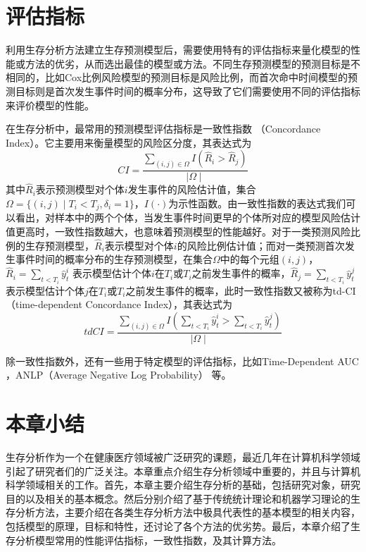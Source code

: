 \section{评估指标}

利用生存分析方法建立生存预测模型后，需要使用特有的评估指标来量化模型的性能或方法的优劣，从而选出最佳的模型或方法。不同生存预测模型的预测目标是不相同的，比如Cox比例风险模型的预测目标是风险比例，而首次命中时间模型的预测目标则是首次发生事件时间的概率分布，这导致了它们需要使用不同的评估指标来评价模型的性能。

在生存分析中，最常用的预测模型评估指标是一致性指数 （Concordance Index）。它主要用来衡量模型的风险区分度，其表达式为
\begin{equation}
CI=\frac{\sum_{(i,j)\in \Omega} I(\hat{R}_i > \hat{R}_j)}{\mid \Omega \mid} \label{F13}
\end{equation}
其中$\hat{R}_i$表示预测模型对个体$i$发生事件的风险估计值，集合$\Omega=\{(i,j)\mid T_i<T_j,\delta_i=1\}$，$I(\cdot)$为示性函数。由一致性指数的表达式我们可以看出，对样本中的两个个体，当发生事件时间更早的个体所对应的模型风险估计值更高时，一致性指数越大，也意味着预测模型的性能越好。对于一类预测风险比例的生存预测模型，$\hat{R}_i$表示模型对个体$i$的风险比例估计值；而对一类预测首次发生事件时间的概率分布的生存预测模型，在集合$\Omega$中的每个元组$(i,j)$，$\hat{R}_i=\sum_{t<T_i} \hat{y}_t^i$ 表示模型估计个体$i$在$T_i$或$T_i$之前发生事件的概率，$\hat{R}_j=\sum_{t<T_i} \hat{y}_t^j$ 表示模型估计个体$j$在$T_i$或$T_i$之前发生事件的概率，此时一致性指数又被称为td-CI （time-dependent Concordance Index），其表达式为
\begin{equation}
tdCI=\frac{\sum_{(i,j)\in \Omega} I(\sum_{t<T_i} \hat{y}_t^i > \sum_{t<T_i} \hat{y}_t^j)}{\mid \Omega \mid} \label{F14}
\end{equation}

除一致性指数外，还有一些用于特定模型的评估指标，比如Time-Dependent AUC ，ANLP（Average Negative Log Probability） 等。

\section{本章小结}

生存分析作为一个在健康医疗领域被广泛研究的课题，最近几年在计算机科学领域引起了研究者们的广泛关注。本章重点介绍生存分析领域中重要的，并且与计算机科学领域相关的工作。首先，本章主要介绍生存分析的基础，包括研究对象，研究目的以及相关的基本概念。然后分别介绍了基于传统统计理论和机器学习理论的生存分析方法，主要介绍在各类生存分析方法中极具代表性的基本模型的相关内容，包括模型的原理，目标和特性，还讨论了各个方法的优劣势。最后，本章介绍了生存分析模型常用的性能评估指标，一致性指数，及其计算方法。
